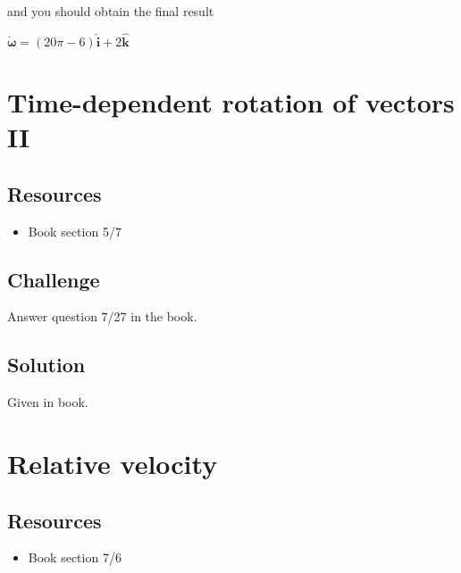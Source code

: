 and you should obtain the final result

$\bm{\dot{\omega}} = (20 \pi - 6) \bm{\hat{i}} + 2 \bm{\hat{k}}$




\newpage
\section{Time-dependent rotation of vectors II}

\subsection*{Resources}
\begin{itemize}
    \item Book section 5/7
\end{itemize}

\subsection*{Challenge}
Answer question 7/27 in the book.

\subsection*{Solution}
Given in book.




%
%




\newpage
\section{Relative velocity}

\subsection*{Resources}
\begin{itemize}
    \item Book section 7/6
\end{itemize}

